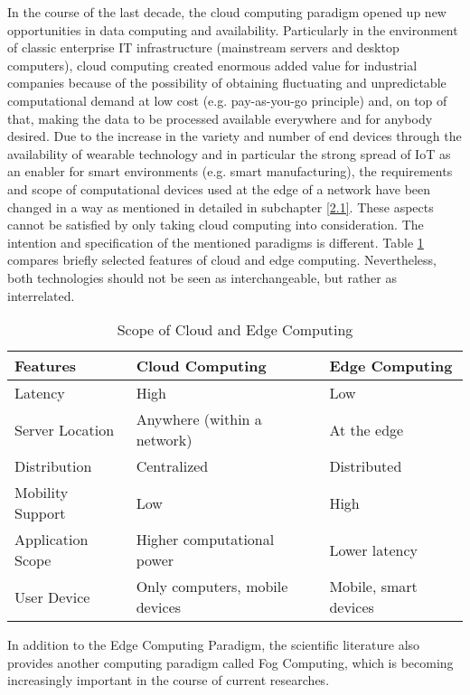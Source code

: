 In the course of the last decade, the cloud computing paradigm opened up new opportunities in data computing and availability. Particularly in the environment of classic enterprise IT infrastructure (mainstream servers and desktop computers), cloud computing created enormous added value for industrial companies because of the possibility of obtaining fluctuating and unpredictable computational demand at low cost (e.g. pay-as-you-go principle) and, on top of that, making the data to be processed available everywhere and for anybody desired.
Due to the increase in the variety and number of end devices through the availability of wearable technology and in particular the strong spread of IoT as an enabler for smart environments (e.g. smart manufacturing), the requirements and scope of computational devices used at the edge of a network have been changed in a way as mentioned in detailed in subchapter \ref{2.1}. These aspects cannot be satisfied by only taking cloud computing into consideration.
The intention and specification of the mentioned paradigms is different. Table \ref{table:1} compares briefly selected features of cloud and edge computing. Nevertheless, both technologies should not be seen as interchangeable, but rather as interrelated.

\begin{table}[h!]
\centering
\begin{tabular}{ |p{2.7cm}|p{4.6cm}|p{4.4cm}|  }
 \hline
 Features & Cloud Computing & Edge Computing \\ [0.5ex] 
 \hline\hline
Latency & High & Low \\
Server Location & Anywhere (within a network) & At the edge \\
Distribution & Centralized & Distributed \\
Mobility Support & Low & High \\
Application Scope & Higher computational power & Lower latency \\
User Device & Only computers, mobile devices & Mobile, smart devices \\
 \hline
\end{tabular}
\caption{Scope of Cloud and Edge Computing}
\label{table:1}
\end{table}
In addition to the Edge Computing Paradigm, the scientific literature also provides another computing paradigm called Fog Computing, which is becoming increasingly important in the course of current researches. 


